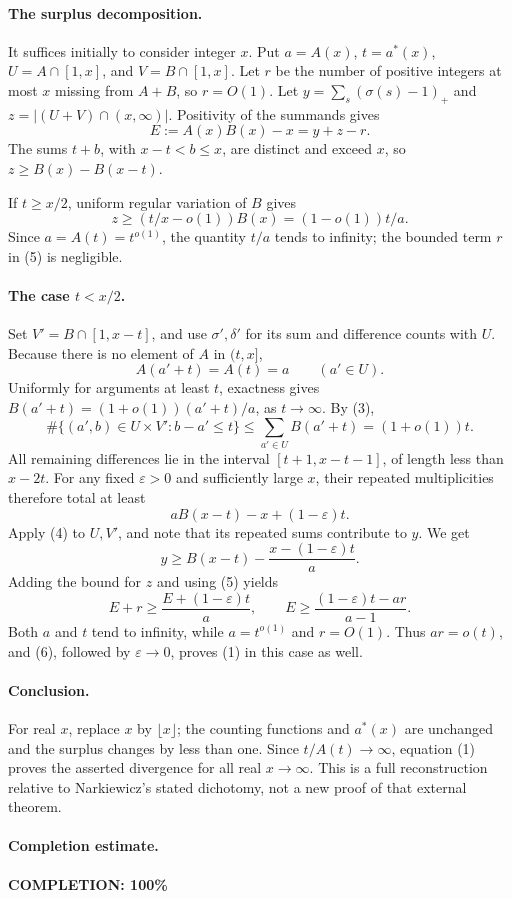 \paragraph{The surplus decomposition.}
It suffices initially to consider integer \(x\).
Put \(a=A(x)\), \(t=a^*(x)\), \(U=A\cap[1,x]\), and
\(V=B\cap[1,x]\).
Let \(r\) be the number of positive integers at most \(x\)
missing from \(A+B\), so \(r=O(1)\).
Let \(y=\sum_s(\sigma(s)-1)_+\) and
\(z=|(U+V)\cap(x,\infty)|\). Positivity of the summands gives
\[
 E:=A(x)B(x)-x=y+z-r.                                         \tag{5}
\]
The sums \(t+b\), with \(x-t<b\leq x\), are distinct and exceed
\(x\), so \(z\geq B(x)-B(x-t)\).

If \(t\geq x/2\), uniform regular variation of \(B\) gives
\[
 z\geq(t/x-o(1))B(x)=(1-o(1))t/a.
\]
Since \(a=A(t)=t^{o(1)}\), the quantity \(t/a\) tends to infinity;
the bounded term \(r\) in (5) is negligible.

\paragraph{The case \(t<x/2\).}
Set \(V'=B\cap[1,x-t]\), and use \(\sigma',\delta'\) for
its sum and difference counts with \(U\).
Because there is no element of \(A\) in \((t,x]\),
\[
 A(a'+t)=A(t)=a\qquad(a'\in U).
\]
Uniformly for arguments at least \(t\), exactness gives
\(B(a'+t)=(1+o(1))(a'+t)/a\), as \(t\to\infty\).
By (3),
\[
 \#\{(a',b)\in U\times V':b-a'\leq t\}
 \leq\sum_{a'\in U}B(a'+t)=(1+o(1))t.
\]
All remaining differences lie in the interval
\([t+1,x-t-1]\), of length less than \(x-2t\).
For any fixed \(\varepsilon>0\) and sufficiently large \(x\),
their repeated multiplicities therefore total at least
\[
 aB(x-t)-x+(1-\varepsilon)t.
\]
Apply (4) to \(U,V'\), and note that its repeated sums
contribute to \(y\). We get
\[
 y\geq B(x-t)-\frac{x-(1-\varepsilon)t}{a}.
\]
Adding the bound for \(z\) and using (5) yields
\[
 E+r\geq \frac{E+(1-\varepsilon)t}{a},
 \qquad
 E\geq\frac{(1-\varepsilon)t-ar}{a-1}.                          \tag{6}
\]
Both \(a\) and \(t\) tend to infinity, while
\(a=t^{o(1)}\) and \(r=O(1)\).
Thus \(ar=o(t)\), and (6), followed by
\(\varepsilon\to0\), proves (1) in this case as well.

\paragraph{Conclusion.}
For real \(x\), replace \(x\) by \(\lfloor x\rfloor\);
the counting functions and \(a^*(x)\) are unchanged and
the surplus changes by less than one.
Since \(t/A(t)\to\infty\), equation (1) proves the
asserted divergence for all real \(x\to\infty\).
This is a full reconstruction relative to Narkiewicz's
stated dichotomy, not a new proof of that external theorem.

\paragraph{Completion estimate.}
\textbf{COMPLETION: 100\%}
